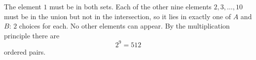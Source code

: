 The element $1$ must be in both sets. Each of the other nine elements $2,3,\dots,10$ must be in the union but not in the intersection, so it lies in exactly one of $A$ and $B$: $2$ choices for each. No other elements can appear. By the multiplication principle there are
\[
2^9=\boxed{512}
\]
ordered pairs.
